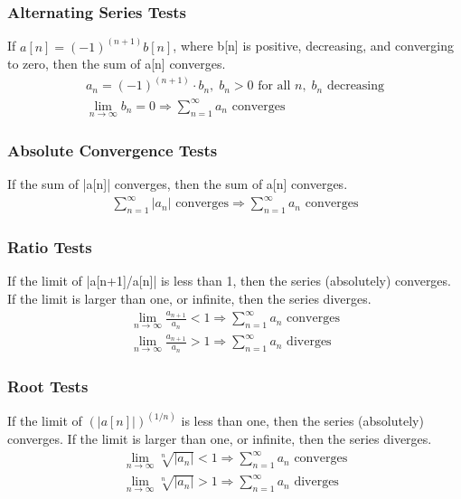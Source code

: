 \documentclass{article}
\begin{document}
        \subsubsection{Alternating Series Tests}
        If $a[n]=(-1)^{(n+1)}b[n]$, where b[n] is positive, decreasing, and converging to zero, then the sum of a[n] converges.
            \begin{gather*}
                a_n=(-1)^{(n+1)} \cdot b_n,\;b_n>0\text{ for all }n,\; b_n \text{ decreasing}\\[6pt]
                \lim_{n\rightarrow\infty} b_n = 0 \Rightarrow \sum^{\infty}_{n=1}a_n\text{ converges}
            \end{gather*}
            
        \subsubsection{Absolute Convergence Tests}
        If the sum of |a[n]| converges, then the sum of a[n] converges.
            \begin{gather*}
                \sum^{\infty}_{n=1}|a_n|\text{ converges} \Rightarrow \sum^{\infty}_{n=1}a_n\text{ converges}
            \end{gather*}
            
        \subsubsection{Ratio Tests}
        If the limit of |a[n+1]/a[n]| is less than 1, then the series (absolutely) converges. If the limit is larger than one, or infinite, then the series diverges.
            \begin{gather*}
                \lim_{n\rightarrow\infty} \frac{a_{n+1}}{a_{n}} < 1 \Rightarrow \sum^{\infty}_{n=1}a_n\text{ converges}\\[6pt]
                \lim_{n\rightarrow\infty} \frac{a_{n+1}}{a_{n}} > 1 \Rightarrow \sum^{\infty}_{n=1}a_n\text{ diverges }
            \end{gather*}
            
        \subsubsection{Root Tests}
        If the limit of $(|a[n]|)^{(1/n)}$ is less than one, then the series (absolutely) converges. If the limit is larger than one, or infinite, then the series diverges.
            \begin{gather*}
                \lim_{n\rightarrow\infty} \sqrt[n]{|a_n|} < 1 \Rightarrow \sum^{\infty}_{n=1}a_n\text{ converges}\\[6pt]
                \lim_{n\rightarrow\infty} \sqrt[n]{|a_n|} > 1 \Rightarrow \sum^{\infty}_{n=1}a_n\text{ diverges }
            \end{gather*}
            
\end{document}
